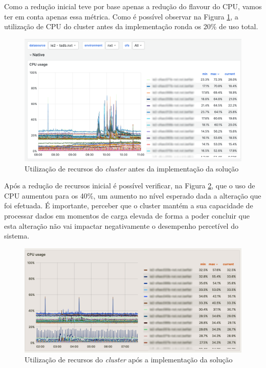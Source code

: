 Como a redução inicial teve por base apenas a redução do \gls{flavour} do \ac{CPU}, vamos ter em conta
apenas essa métrica. Como é possível observar na Figura \ref{usage-before}, a utilização de \ac{CPU}
do \gls{cluster} antes da implementação ronda os 20\% de uso total.

\begin{figure}[H]
  \centerline{\includegraphics[scale=0.25]{media/content/impl/grafana-before-1.png}}
  \caption{Utilização de recursos do \textit{cluster} antes da implementação da solução}
  \label{usage-before}
\end{figure}

Após a redução de recursos inicial é possível verificar, na Figura \ref{usage-after}, que o uso 
de CPU aumentou para os 40\%, um aumento no nível esperado dada a alteração que foi efetuada. É 
importante, perceber que o \gls{cluster} mantém a sua capacidade de processar dados em momentos de 
carga elevada de forma a poder concluir que esta alteração não vai impactar negativamente o 
desempenho percetível do sistema. 

\begin{figure}[H]
  \centerline{\includegraphics[scale=0.5]{media/content/impl/grafana-after.png}}
  \caption{Utilização de recursos do \textit{cluster} após a implementação da solução}
  \label{usage-after}
\end{figure}

